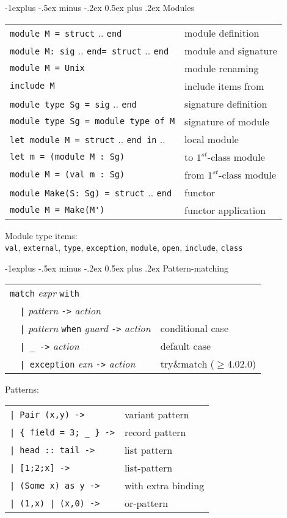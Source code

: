 \documentclass[10pt,landscape]{article}
\makeatletter
\renewcommand{\subsection}{\@startsection{subsection}{2}{0mm}%
                                {-1explus -.5ex minus -.2ex}%
                                {0.5ex plus .2ex}%
                                {\normalfont\normalsize\bfseries}}
\makeatother
\begin{document}
\begin{multicols}{3}
{\subsection{Modules}

\begin{tabular}{ll}
\verb!module M = struct! .. \verb!end! & module definition\\
\verb!module M: sig! .. \verb!end= struct! .. \verb!end! & module and signature\\
\verb!module M = Unix! & module renaming \\
\verb!include M! & include items from \\
\verb!module type Sg = sig! .. \verb!end! & signature definition\\
\verb!module type Sg = module type of M! & signature of module\\
\verb!let module M = struct! .. \verb!end in! ..  & local module \\
\verb!let m = (module M : Sg)! & to $1^{st}$-class module\\
\verb!module M = (val m : Sg)! & from $1^{st}$-class module\\
\verb!module Make(S: Sg) = struct! .. \verb!end! & functor \\
\verb!module M = Make(M')! & functor application \\
\end{tabular}

Module type items:\\
\verb!val!, \verb!external!, \verb!type!, \verb!exception!, \verb!module!, \verb!open!, \verb!include!, \verb!class!

\subsection{Pattern-matching}

\begin{tabular}{ll}
\verb!match! \emph{expr} \verb!with! \\
\verb!  |! \emph{pattern} \verb!->! \emph{action}\\
\verb!  |! \emph{pattern} \verb!when! \emph{guard} \verb!->! \emph{action}
& conditional case \\
\verb!  | _ ->! \emph{action} & default case\\
\verb!  | exception! \emph{exn} \verb!->! \emph{action} & try\&match ($\geq$4.02.0) \\
\end{tabular}
Patterns:\\
\begin{tabular}{ll}
\verb!| Pair (x,y) ->! & variant pattern \\
\verb!| { field = 3; _ } ->! & record pattern \\
\verb!| head :: tail ->! & list pattern \\
\verb!| [1;2;x] ->! & list-pattern \\
\verb!| (Some x) as y ->! & with extra binding \\
\verb!| (1,x) | (x,0) ->! & or-pattern \\
\end{tabular}
}


\end{multicols}
\end{document}
